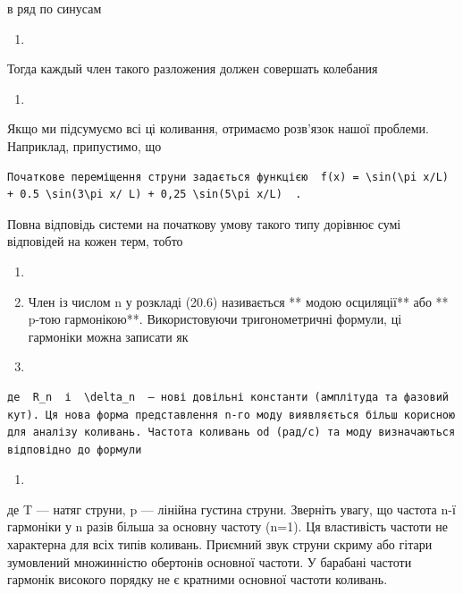 \documentclass[
  ukrainian,
]{article}
\providecommand{\tightlist}{%
  \setlength{\itemsep}{0pt}\setlength{\parskip}{0pt}}
\begin{document}
в ряд по синусам

\begin{enumerate}
\def\labelenumi{\arabic{enumi}.}
\setcounter{enumi}{15}
\tightlist
\item
\end{enumerate}

Тогда каждый член такого разложения должен совершать колебания

\begin{enumerate}
\def\labelenumi{\arabic{enumi}.}
\setcounter{enumi}{16}
\tightlist
\item
\end{enumerate}

Якщо ми підсумуємо всі ці коливання, отримаємо розв'язок нашої проблеми.
Наприклад, припустимо, що

\begin{verbatim}
Початкове переміщення струни задається функцією  f(x) = \sin(\pi x/L) + 0.5 \sin(3\pi x/ L) + 0,25 \sin(5\pi x/L)  .
\end{verbatim}

Повна відповідь системи на початкову умову такого типу дорівнює сумі
відповідей на кожен терм, тобто

\begin{enumerate}
\def\labelenumi{\arabic{enumi}.}
\setcounter{enumi}{17}
\item
\item
  Член із числом n у розкладі (20.6) називається ** модою осциляції**
  або ** p-тою гармонікою**. Використовуючи тригонометричні формули, ці
  гармоніки можна записати як
\item
\end{enumerate}

\begin{verbatim}
де  R_n  і  \delta_n  — нові довільні константи (амплітуда та фазовий кут). Ця нова форма представлення n-го моду виявляється більш корисною для аналізу коливань. Частота коливань od (рад/с) та моду визначаються відповідно до формули
\end{verbatim}

\begin{enumerate}
\def\labelenumi{\arabic{enumi}.}
\setcounter{enumi}{9}
\tightlist
\item
\end{enumerate}

де T --- натяг струни, p --- лінійна густина струни. Зверніть увагу, що
частота n-ї гармоніки у n разів більша за основну частоту (n=1). Ця
властивість частоти не характерна для всіх типів коливань. Приємний звук
струни скриму або гітари зумовлений множинністю обертонів основної
частоти. У барабані частоти гармонік високого порядку не є кратними
основної частоти коливань.
\end{document}
